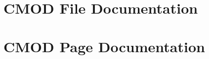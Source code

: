 \documentclass[a4paper]{book}
\begin{document}
\chapter{CMOD File Documentation}
































\chapter{CMOD Page Documentation}

\printindex
\end{document}
